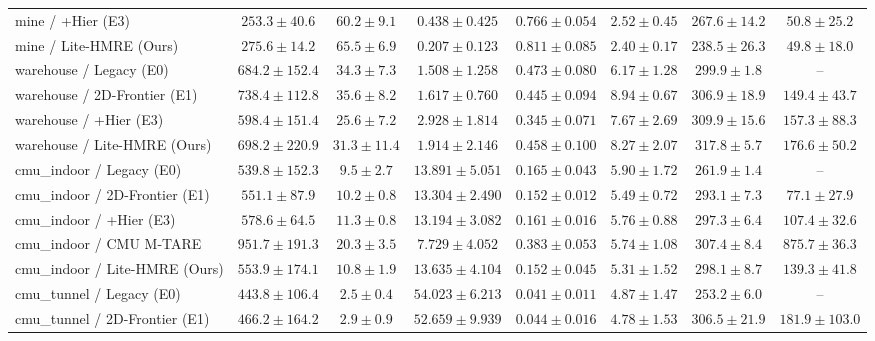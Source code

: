 \begin{table}[t]
\begin{tabular}{lccccccc}
mine / +Hier (E3) & $253.3 \pm 40.6$ & $60.2 \pm 9.1$ & $0.438 \pm 0.425$ & $0.766 \pm 0.054$ & $2.52 \pm 0.45$ & $267.6 \pm 14.2$ & $50.8 \pm 25.2$ \\
mine / Lite-HMRE (Ours) & $\mathbf{275.6 \pm 14.2}$ & $\mathbf{65.5 \pm 6.9}$ & $\mathbf{0.207 \pm 0.123}$ & $\mathbf{0.811 \pm 0.085}$ & $2.40 \pm 0.17$ & $238.5 \pm 26.3$ & $49.8 \pm 18.0$ \\
\midrule
warehouse / Legacy (E0) & $684.2 \pm 152.4$ & $34.3 \pm 7.3$ & $\mathbf{1.508 \pm 1.258}$ & $\mathbf{0.473 \pm 0.080}$ & $6.17 \pm 1.28$ & $\mathbf{299.9 \pm 1.8}$ & -- \\
warehouse / 2D-Frontier (E1) & $\mathbf{738.4 \pm 112.8}$ & $\mathbf{35.6 \pm 8.2}$ & $1.617 \pm 0.760$ & $0.445 \pm 0.094$ & $\mathbf{8.94 \pm 0.67}$ & $306.9 \pm 18.9$ & $\mathbf{149.4 \pm 43.7}$ \\
warehouse / +Hier (E3) & $598.4 \pm 151.4$ & $25.6 \pm 7.2$ & $2.928 \pm 1.814$ & $0.345 \pm 0.071$ & $7.67 \pm 2.69$ & $309.9 \pm 15.6$ & $157.3 \pm 88.3$ \\
warehouse / Lite-HMRE (Ours) & $698.2 \pm 220.9$ & $31.3 \pm 11.4$ & $1.914 \pm 2.146$ & $0.458 \pm 0.100$ & $8.27 \pm 2.07$ & $317.8 \pm 5.7$ & $176.6 \pm 50.2$ \\
\midrule
cmu\_indoor / Legacy (E0) & $539.8 \pm 152.3$ & $9.5 \pm 2.7$ & $13.891 \pm 5.051$ & $0.165 \pm 0.043$ & $\mathbf{5.90 \pm 1.72}$ & $\mathbf{261.9 \pm 1.4}$ & -- \\
cmu\_indoor / 2D-Frontier (E1) & $551.1 \pm 87.9$ & $10.2 \pm 0.8$ & $13.304 \pm 2.490$ & $0.152 \pm 0.012$ & $5.49 \pm 0.72$ & $293.1 \pm 7.3$ & $\mathbf{77.1 \pm 27.9}$ \\
cmu\_indoor / +Hier (E3) & $578.6 \pm 64.5$ & $11.3 \pm 0.8$ & $13.194 \pm 3.082$ & $0.161 \pm 0.016$ & $5.76 \pm 0.88$ & $297.3 \pm 6.4$ & $107.4 \pm 32.6$ \\
cmu\_indoor / CMU M-TARE & $\mathbf{951.7 \pm 191.3}$ & $\mathbf{20.3 \pm 3.5}$ & $\mathbf{7.729 \pm 4.052}$ & $\mathbf{0.383 \pm 0.053}$ & $5.74 \pm 1.08$ & $307.4 \pm 8.4$ & $875.7 \pm 36.3$ \\
cmu\_indoor / Lite-HMRE (Ours) & $553.9 \pm 174.1$ & $10.8 \pm 1.9$ & $13.635 \pm 4.104$ & $0.152 \pm 0.045$ & $5.31 \pm 1.52$ & $298.1 \pm 8.7$ & $139.3 \pm 41.8$ \\
\midrule
cmu\_tunnel / Legacy (E0) & $443.8 \pm 106.4$ & $2.5 \pm 0.4$ & $54.023 \pm 6.213$ & $0.041 \pm 0.011$ & $4.87 \pm 1.47$ & $\mathbf{253.2 \pm 6.0}$ & -- \\
cmu\_tunnel / 2D-Frontier (E1) & $466.2 \pm 164.2$ & $2.9 \pm 0.9$ & $52.659 \pm 9.939$ & $0.044 \pm 0.016$ & $4.78 \pm 1.53$ & $306.5 \pm 21.9$ & $181.9 \pm 103.0$ \\

\end{tabular}
\end{table}
